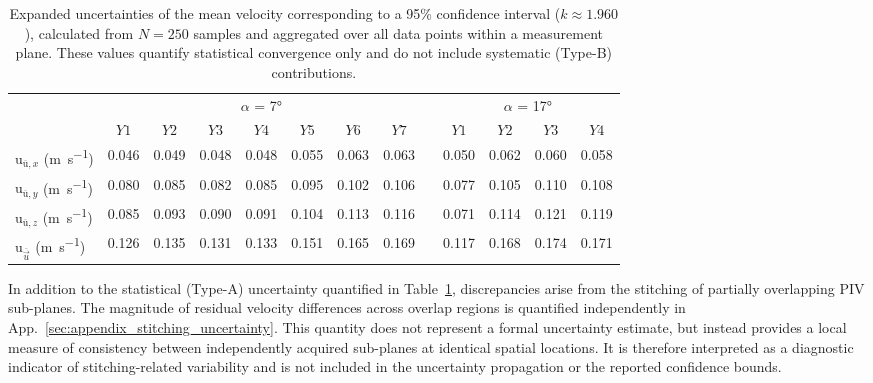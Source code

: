 \documentclass[wes, manuscript]{copernicus}
\begin{document}
\begin{table}[htp]
    \centering
    \caption{Expanded uncertainties of the mean velocity corresponding to a 95\% confidence interval ($k \approx 1.960$), calculated from $N=250$ samples and aggregated over all data points within a measurement plane. These values quantify statistical convergence only and do not include systematic (Type-B) contributions.}
    \label{tab:uncertainty}
    \begin{tabular}{l ccccccc l cccc}
    \hline
    & \multicolumn{7}{c}{$\alpha$ = 7\unit{\degree}} & & \multicolumn{4}{c}{$\alpha$ = 17\unit{\degree}} \\
     & $Y1$ & $Y2$ & $Y3$ & $Y4$ & $Y5$ & $Y6$ & $Y7$ & & $Y1$ & $Y2$ & $Y3$ & $Y4$ \\
    \hline
    $\textrm{u}_{\overline{\textrm{u}},{x}}$ (\unit{m s^{-1}}) & 0.046 & 0.049 & 0.048 & 0.048 & 0.055 & 0.063 & 0.063 & & 0.050 & 0.062 & 0.060 & 0.058 \\
    $\textrm{u}_{\overline{\textrm{u}},{y}}$ (\unit{m s^{-1}}) & 0.080 & 0.085 & 0.082 & 0.085 & 0.095 & 0.102 & 0.106 & & 0.077 & 0.105 & 0.110 & 0.108 \\
    $\textrm{u}_{\overline{\textrm{u}},{z}}$ (\unit{m s^{-1}}) & 0.085 & 0.093 & 0.090 & 0.091 & 0.104 & 0.113 & 0.116 & & 0.071 & 0.114 & 0.121 & 0.119 \\
    $\textrm{u}_{\overline{\vec{u}}}$ (\unit{m s^{-1}}) & 0.126 & 0.135 & 0.131 & 0.133 & 0.151 & 0.165 & 0.169 & & 0.117 & 0.168 & 0.174 & 0.171 \\
    \hline
    \end{tabular}
\end{table}
%

In addition to the statistical (Type-A) uncertainty quantified in Table~\ref{tab:uncertainty}, discrepancies arise from the stitching of partially overlapping PIV sub-planes.
The magnitude of residual velocity differences across overlap regions is quantified independently in App.~\ref{sec:appendix_stitching_uncertainty}.
This quantity does not represent a formal uncertainty estimate, but instead provides a local measure of consistency between independently acquired sub-planes at identical spatial locations.
It is therefore interpreted as a diagnostic indicator of stitching-related variability and is not included in the uncertainty propagation or the reported confidence bounds.
%
\end{document}
